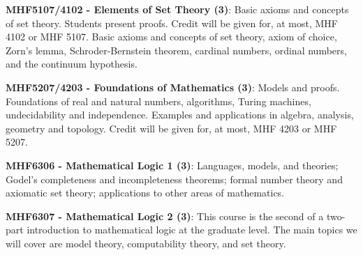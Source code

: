 \documentclass[11pt]{article}
\begin{document}
\textbf{MHF5107/4102 - Elements of Set Theory (3)}: Basic axioms and concepts of set theory. Students present proofs. Credit will be given for, at most, MHF 4102 or MHF 5107. Basic axioms and concepts of set theory, axiom of choice, Zorn's lemma, Schroder-Bernstein theorem, cardinal numbers, ordinal numbers, and the continuum hypothesis.

\textbf{MHF5207/4203 - Foundations of Mathematics (3)}: Models and proofs. Foundations of real and natural numbers, algorithms, Turing machines, undecidability and independence. Examples and applications in algebra, analysis, geometry and topology. Credit will be given for, at most, MHF 4203 or MHF 5207.

\textbf{MHF6306 - Mathematical Logic 1 (3)}: Languages, models, and theories; Godel's completeness and incompleteness theorems; formal number theory and axiomatic set theory; applications to other areas of mathematics.

\textbf{MHF6307 - Mathematical Logic 2 (3)}: This course is the second of a two-part introduction to mathematical logic at the graduate level. The main topics we will cover are model theory, computability theory, and set theory.
\end{document}
